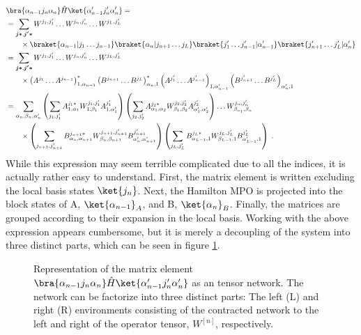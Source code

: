\begin{align}
&	\bra{\alpha_{n-1} j_n \alpha_{n}} \hat{H} \ket{\alpha_{n-1} ' j_n ' \alpha_{n} '} = \nonumber \\
 &= \sum_{\boldsymbol{j *} , \boldsymbol{j' * }}  W^{j_1 , j_1 '} \ldots W^{j_n , j_n '} \ldots W^{j_L , j_L '} \nonumber \\
	& \qquad \times \braket{\alpha_{n-1} | j_1 \ldots j_{n-1}} \braket{\alpha_{n} | j_{n+1} \ldots j_{L}} \braket{j_1 ' \ldots j_{n-1} ' | \alpha_{n-1} '} \braket{j_{n+1} ' \ldots j_{L} ' | \alpha_{n} '} \nonumber \\
	&= \sum_{\boldsymbol{j *} , \boldsymbol{j' * }}  W^{j_1 , j_1 '} \ldots W^{j_n , j_n '} \ldots W^{j_L , j_L '} \nonumber \\
	& \qquad \times \left( A^{j_1} \ldots A^{j_{n-1}} \right)_{1 , \alpha_{n-1}}^{*} \left( B^{j_{n+1}} \ldots B^{j_{L}} \right)_{ \alpha_{n} , 1}^{*} \left( A^{j_1 '} \ldots A^{j_{n-1} '} \right)_{1 , \alpha_{n-1} '} \left( B^{j_{n+1} '} \ldots B^{j_{L} '} \right)_{ \alpha_{n} ' , 1} \nonumber \\
	&= \sum_{\alpha_n , \beta_n , \alpha_n '}
	\left( \sum_{j_1 , j_1 '} A_{1 , \alpha_1}^{j_1 *} W_{1, \beta_1}^{j_1 , j_1 '} A_{1 , \alpha_1 '}^{j_1 '} \right)
	\left( \sum_{j_2 , j_2 '} A_{\alpha_1 , \alpha_2}^{j_2 *} W_{\beta_1, \beta_2}^{j_2 , j_2 '} A_{\alpha_1 ' , \alpha_2 '}^{j_2 '} \right)
	\ldots W_{\beta_{n_1}, \beta_n}^{j_n , j_n '} \nonumber \\
	& \qquad \times \left( \sum_{j_{n+1} , j_{n+1} '} B_{\alpha_n , \alpha_{n+1}}^{j_{n+1} *} W_{\beta_n, \beta_{n+1}}^{j_{n+1} , j_{n+1} '} B_{\alpha_n ', \alpha_{n+1} '}^{j_{n+1} '} \right)
	\left( \sum_{j_{L} , j_{L} '} B_{\alpha_{L-1} , 1}^{j_{L} *} W_{\beta_{L-1}, 1}^{j_{L} , j_{L} '} B_{\alpha_{L-1}' , 1 }^{j_{L} '} \right)  \; .
\end{align}  
While this expression may seem terrible complicated due to all the indices, it is actually rather easy to understand. First, the matrix element is written excluding the local basis states $\ket{j_n}$. Next, the Hamilton MPO is projected into the block states of A, $\ket{\alpha_{n-1}}_A$, and B, $\ket{\alpha_{n}}_B$. Finally, the matrices are grouped according to their expansion in the local basis. Working with the above expression appears cumbersome, but it is merely a decoupling of the system into three distinct parts, which can be seen in figure \ref{fig:singleElemHamil}.
\begin{figure}[h!]
	\centering
	
	\caption{Representation of the matrix element $\bra{\alpha_{n-1} j_n \alpha_{n}} \hat{H} \ket{\alpha_{n-1} ' j_n ' \alpha_{n} '}$ as an tensor network. The network can be factorize into three distinct parts: The left (L) and right (R) environments consisting of the contracted network to the left and right of the operator tensor, $W^{[n]}$, respectively.}
	\label{fig:singleElemHamil}
\end{figure}
